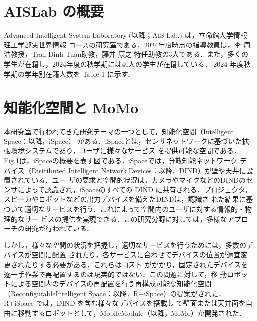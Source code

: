 \documentclass[11pt, a4paper]{jarticle}
\begin{document}
\author{B3 塚 春輝} %
\date{2025/03/11} %

\maketitle %






\section{AISLab の概要}
Advanced Intelligent System Laboratory (以降；AIS Lab.) は，立命館大学情報理工学部実世界情報
コースの研究室である．2024年度時点の指導教員は，李 周浩教授，Tran Dinh Tuan助教，藤井 康之
特任助教の3人である．また，多くの学生が在籍し，2024年度の秋学期には40人の学生が在籍している．
2024 年度秋学期の学年別在籍人数を Table 1 に示す．

\section{知能化空間と MoMo}
本研究室で行われてきた研究テーマの一つとして，知能化空間（Intelligent Space：以降，iSpace）\cite{dd}
がある．iSpaceとは，センサネットワークに基づいた拡張環境システムであり，ユーザに様々なサービス
を提供可能な空間である．Fig.1は，iSpaceの概要を表す図である．iSpaceでは，分散知能ネットワーク
デバイス（Distributed Intelligent Network Devices：以降，DIND）が壁や天井に設置されている．ユー
ザの要求と空間的状況は，カメラやマイクなどのDINDのセンサによって認識され，iSpaceのすべての
DIND に共有される．プロジェクタ，スピーカやロボットなどの出力デバイスを備えたDINDは，認識さ
れた結果に基づいて適切なサービスを行う．これによって空間内のユーザに対する情報的・物理的なサー
ビスの提供を実現できる．この研究分野に対しては，多様なアプローチの研究が行われている．

しかし，様々な空間の状況を把握し，適切なサービスを行うためには，多数のデバイスが空間に配置
されたり，各サービスに合わせてデバイスの位置が適宜変更されたりする必要がある．これらはコスト
がかかり，固定されたデバイスを逐一手作業で再配置するのは現実的ではない．この問題に対して，移
動ロボットによる空間内のデバイスの再配置を行う再構成可能な知能化空間（ReconfigurableIntelligent
 Space：以降，R+iSpace）の提案がされた\cite{ee}．R+iSpace では，DIND を含む様々なデバイスを搭載し
て壁面または天井面を自由に移動するロボットとして，MobileModule（以降，MoMo）が開発された．
\end{document}
